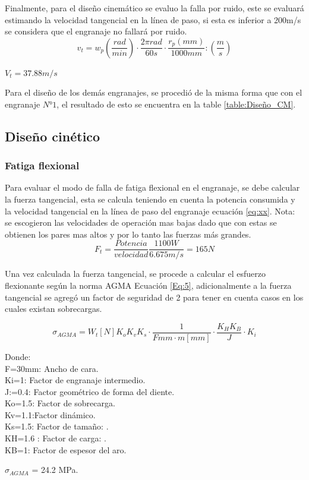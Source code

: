 Finalmente, para el diseño cinemático se evaluo la falla por ruido, este se evaluará estimando la velocidad tangencial en la línea de paso, si esta es inferior a 200m/s se considera que el engranaje no fallará por ruido.
\begin{equation}
 v_{t}=w_{p}(\frac{rad}{min})\cdot\frac{2\pi rad}{60 s}\cdot\frac{r_{p}(mm)}{1000mm}:(\frac{m}{s})
\label{Eq:4}    
\end{equation}

\begin{center}
    $V_{t}=37.88 m/s$
\end{center}

Para el diseño de los demás engranajes, se procedió de la misma forma que con el engranaje $N° 1$, el resultado de esto se encuentra en la table \ref{table:Diseño_CM}.

\subsection*{Diseño cinético}
\subsubsection*{Fatiga flexional}
Para evaluar el modo de falla de fatiga flexional en el engranaje, se debe calcular la fuerza tangencial, esta se calcula teniendo en cuenta la potencia consumida y la velocidad tangencial en la línea de paso del engranaje ecuación \ref{eq:xx}. Nota: se escogieron las velocidades de operación mas bajas dado que con estas se obtienen los pares mas altos y por lo tanto las fuerzas más grandes.
\begin{equation}
F_{t} = \frac{Potencia}{velocidad}  
\frac{1100 W}{6.675 m/s}=165 N
 \label{eq:xx}
\end{equation}

Una vez calculada la fuerza tangencial, se procede a calcular el esfuerzo flexionante según la norma AGMA  Ecuación \ref{Eq:5}, adicionalmente a la fuerza tangencial se agregó un factor de seguridad de 2 para tener en cuenta casos en los cuales existan sobrecargas.

\begin{equation}
 \sigma_{AGMA}=W_{t}[N]K_{o}K_{v}K_{s}\cdot \frac{1}{F{mm}\cdot m[mm]} \cdot \frac{K_{H}K_{B}}{J} \cdot K_{i}
\label{Eq:5}    
\end{equation}

Donde:\\
F=30mm: Ancho de cara.\\
Ki=1: Factor de engranaje intermedio.\\
J:=0.4: Factor geométrico de forma del diente.\\
Ko=1.5: Factor de sobrecarga.\\
Kv=1.1:Factor dinámico.\\
Ks=1.5: Factor de tamaño: .\\
KH=1.6 : Factor de carga: .\\
KB=1: Factor de espesor del aro.
\begin{center}
    $\sigma_{AGMA}$ = 24.2 MPa.
\end{center}


